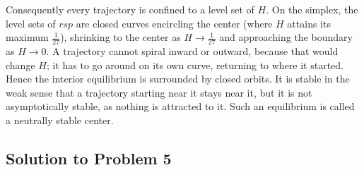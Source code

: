 \documentclass[a4paper,12pt]{article}
\begin{document}
\begin{enumerate}[label=(\alph*)]
Consequently every trajectory is confined to a level set of $H$. On the simplex, the level sets of $rsp$ are closed curves encircling the center (where $H$ attains its maximum $\frac{1}{27}$), shrinking to the center as $H \to \frac{1}{27}$ and approaching the boundary as $H \to 0$. A trajectory cannot spiral inward or outward, because that would change $H$; it has to go around on its own curve, returning to where it started. Hence the interior equilibrium is surrounded by closed orbits. It is stable in the weak sense that a trajectory starting near it stays near it, but it is not asymptotically stable, as nothing is attracted to it. Such an equilibrium is called a neutrally stable center.
\end{enumerate}


\subsection*{Solution to Problem 5}
\end{document}
